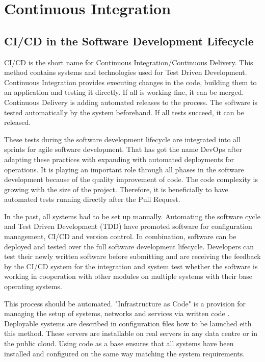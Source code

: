 \chapter{Continuous Integration}\label{ch:ci_cd}

\section{\gls{CI/CD} in the Software Development Lifecycle}

\gls{CI/CD} is the short name for Continuous Integration/Continuous Delivery. This method contains systems and technologies used for Test Driven Development. Continuous Integration provides executing changes in the code, building them to an application and testing it directly. 
If all is working fine, it can be merged. Continuous Delivery is adding automated releases to the process. 
The software is tested automatically by the system beforehand. If all tests succeed, it can be released.

These tests during the software development lifecycle are integrated into all sprints for agile software development. That has got the name DevOps after adapting these practices with expanding with automated deployments for operations. It is playing an important role through all phases in the software development because of the quality improvement of code. The code complexity is growing with the size of the project. Therefore, it is beneficially to have automated tests running directly after the Pull Request. 

In the past, all systems had to be set up manually. Automating the software cycle and Test Driven Development (TDD) have promoted software for configuration management, \gls{CI/CD} and version control. In combination, software can be deployed and tested over the full software development lifecycle. Developers can test their newly written software before submitting and are receiving the feedback by the \gls{CI/CD} system for the integration and system test whether the software is working in cooperation with other modules on multiple systems with their base operating systems.

This process should be automated. "Infrastructure as Code" is a provision for managing the setup of systems, networks and services via written code \cite[~p.110]{Scholl2019}. Deployable systems are described in configuration files how to be launched eith this method. These servers are installable on real servers in any data centre or in the public cloud. Using code as a base ensures that all systems have been installed and configured on the same way matching the system requirements. 

